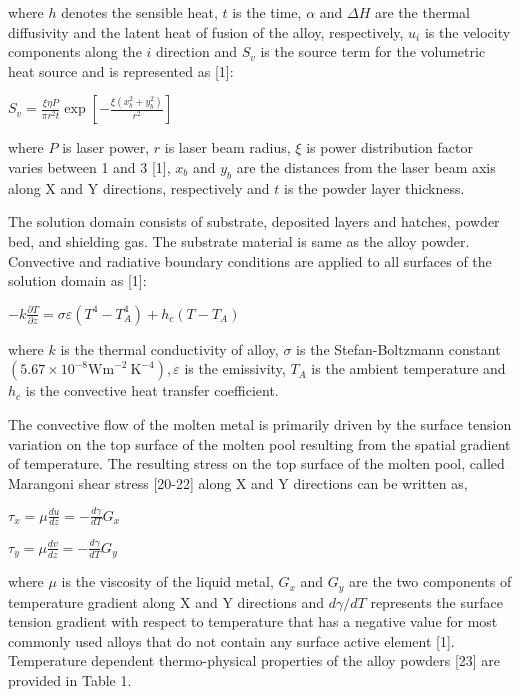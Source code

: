 \documentclass[10pt]{article}
\begin{document}
where $h$ denotes the sensible heat, $t$ is the time, $\alpha$ and $\Delta H$ are the thermal diffusivity and the latent heat of fusion of the alloy, respectively, $u_{i}$ is the velocity components along the $i$ direction and $S_{v}$ is the source term for the volumetric heat source and is represented as [1]:

$S_{v}=\frac{\xi \eta P}{\pi r^{2} t} \exp \left[-\frac{\xi\left(x_{b}^{2}+y_{b}^{2}\right)}{r^{2}}\right]$

where $P$ is laser power, $r$ is laser beam radius, $\xi$ is power distribution factor varies between 1 and 3 [1], $x_{b}$ and $y_{b}$ are the distances from the laser beam axis along $\mathrm{X}$ and $\mathrm{Y}$ directions, respectively and $t$ is the powder layer thickness.

The solution domain consists of substrate, deposited layers and hatches, powder bed, and shielding gas. The substrate material is same as the alloy powder. Convective and radiative boundary conditions are applied to all surfaces of the solution domain as [1]:

$-k \frac{\partial T}{\partial z}=\sigma \varepsilon\left(T^{4}-T_{A}^{4}\right)+h_{c}\left(T-T_{A}\right)$

where $k$ is the thermal conductivity of alloy, $\sigma$ is the Stefan-Boltzmann constant $\left(5.67 \times 10^{-8} \mathrm{Wm}^{-2} \mathrm{~K}^{-4}\right), \varepsilon$ is the emissivity, $T_{A}$ is the ambient temperature and $h_{c}$ is the convective heat transfer coefficient.

The convective flow of the molten metal is primarily driven by the surface tension variation on the top surface of the molten pool resulting from the spatial gradient of temperature. The resulting stress on the top surface of the molten pool, called Marangoni shear stress [20-22] along $\mathrm{X}$ and $\mathrm{Y}$ directions can be written as,

$\tau_{x}=\mu \frac{d u}{d z}=-\frac{d \gamma}{d T} G_{x}$

$\tau_{y}=\mu \frac{d v}{d z}=-\frac{d \gamma}{d T} G_{y}$

where $\mu$ is the viscosity of the liquid metal, $G_{x}$ and $G_{y}$ are the two components of temperature gradient along $\mathrm{X}$ and $\mathrm{Y}$ directions and $d \gamma / d T$ represents the surface tension gradient with respect to temperature that has a negative value for most commonly used alloys that do not contain any surface active element [1]. Temperature dependent thermo-physical properties of the alloy powders [23] are provided in Table 1.
\end{document}
